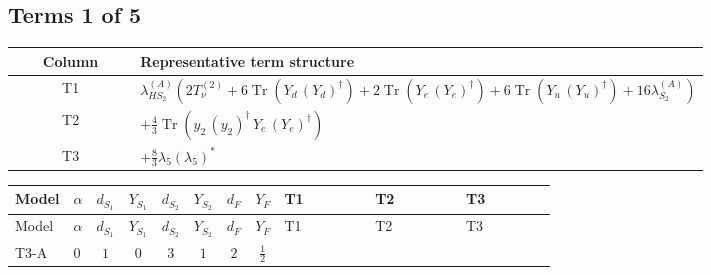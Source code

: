 \documentclass[8pt]{article}
\begin{document}
\begin{landscape}
\subsection*{Terms 1 of 5}
\begin{center}
\begin{tabular}{@{}c >{\raggedright\arraybackslash}p{0.82\linewidth}@{}}
\toprule
Column & Representative term structure \\
\midrule
T1 & \(\displaystyle {\lambda_{HS_2}^{(A)}} (2 T_{\nu}^{(2)}+6 \operatorname{Tr}\!\left({Y_d}\,\left({Y_d}\right)^{\dagger}\right)+2 \operatorname{Tr}\!\left({Y_e}\,\left({Y_e}\right)^{\dagger}\right)+6 \operatorname{Tr}\!\left({Y_u}\,\left({Y_u}\right)^{\dagger}\right)+16 {\lambda_{S_2}^{(A)}})\) \\
\midrule
T2 & \(\displaystyle +\frac{4}{3} \operatorname{Tr}\!\left({y_2}\,\left({y_2}\right)^{\dagger}\,{Y_e}\,\left({Y_e}\right)^{\dagger}\right)\) \\
\midrule
T3 & \(\displaystyle +\frac{8}{3} {\lambda_5} \left({\lambda_5}\right)^{*}\) \\
\midrule
\bottomrule
\end{tabular}
\end{center}
\smallskip
\tiny
\begin{longtable}{@{}llcccccc >{\raggedright\arraybackslash}p{0.21\linewidth} >{\raggedright\arraybackslash}p{0.21\linewidth} >{\raggedright\arraybackslash}p{0.21\linewidth}@{}}
\toprule
Model & $\alpha$ & $d_{S_1}$ & $Y_{S_1}$ & $d_{S_2}$ & $Y_{S_2}$ & $d_F$ & $Y_F$ & T1 & T2 & T3 \\
\midrule
\endfirsthead
\toprule
Model & $\alpha$ & $d_{S_1}$ & $Y_{S_1}$ & $d_{S_2}$ & $Y_{S_2}$ & $d_F$ & $Y_F$ & T1 & T2 & T3 \\
\midrule
\endhead
T3-A & $0$ & $1$ & $0$ & $3$ & $1$ & $2$ & $\frac{1}{2}$ & \scriptsize\adjustbox{max width=\linewidth}{$\begin{gathered} {\lambda_{HS_2}^{(A)}} (2 T_{\nu}^{(2)}+6 \operatorname{Tr}\!\left({Y_d}\,\left({Y_d}\right)^{\dagger}\right)+2 \operatorname{Tr}\!\left({Y_e}\,\left({Y_e}\right)^{\dagger}\right)+6 \operatorname{Tr}\!\left({Y_u}\,\left({Y_u}\right)^{\dagger}\right)+16 {\lambda_{S_2}^{(A)}})\end{gathered}$} & \scriptsize\adjustbox{max width=\linewidth}{$\begin{gathered} +\frac{4}{3} \operatorname{Tr}\!\left({y_2}\,\left({y_2}\right)^{\dagger}\,{Y_e}\,\left({Y_e}\right)^{\dagger}\right)\end{gathered}$} & \scriptsize\adjustbox{max width=\linewidth}{$\begin{gathered} +\frac{8}{3} {\lambda_5} \left({\lambda_5}\right)^{*}\end{gathered}$} \\

\end{longtable}
\end{landscape}
\end{document}
